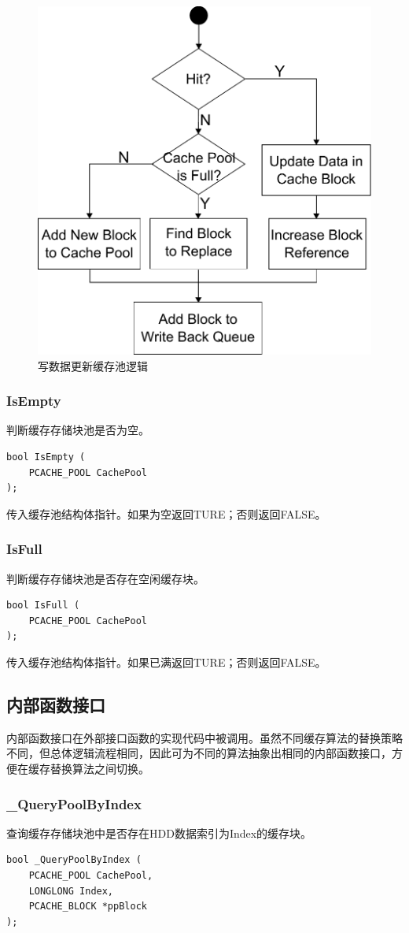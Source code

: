 \begin{figure}[H]
\centering
\includegraphics[width=0.6\linewidth]{./graph/write-update-pool}
\caption{写数据更新缓存池逻辑}
\label{fig:write-update-pool}
\end{figure}

\subsubsection{IsEmpty}
判断缓存存储块池是否为空。
\begin{lstlisting}
bool IsEmpty (
    PCACHE_POOL CachePool
);
\end{lstlisting}

传入缓存池结构体指针。如果为空返回TURE；否则返回FALSE。

\subsubsection{IsFull}
判断缓存存储块池是否存在空闲缓存块。
\begin{lstlisting}
bool IsFull (
    PCACHE_POOL CachePool
);
\end{lstlisting}

传入缓存池结构体指针。如果已满返回TURE；否则返回FALSE。

\subsection{内部函数接口}

内部函数接口在外部接口函数的实现代码中被调用。虽然不同缓存算法的替换策略不同，但总体逻辑流程相同，因此可为不同的算法抽象出相同的内部函数接口，方便在缓存替换算法之间切换。

\subsubsection{\_QueryPoolByIndex}
查询缓存存储块池中是否存在HDD数据索引为Index的缓存块。
\begin{lstlisting}
bool _QueryPoolByIndex (
    PCACHE_POOL CachePool,
    LONGLONG Index,
    PCACHE_BLOCK *ppBlock
);
\end{lstlisting}

